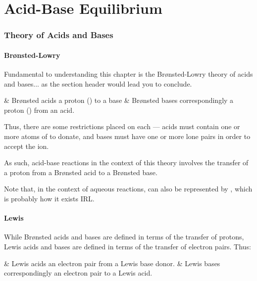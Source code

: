 

\pagebreak
\part{Acid-Base Equilibrium}

	\section{Theory of Acids and Bases}

		\subsection{Brønsted-Lowry}

			Fundamental to understanding this chapter is the Brønsted-Lowry theory of acids and bases... as the section header would lead you
			to conclude.

			\begin{bulletlist}
				& Brønsted acids  a proton () to a base
				& Brønsted bases correspondingly  a proton () from an acid.
			\end{bulletlist}

			Thus, there are some restrictions placed on each --- acids must contain one or more atoms of  to donate, and bases must have
			one or more lone pairs in order to accept the \ch{H+} ion.

			As such, acid-base reactions in the context of this theory involves the transfer of a proton from a Brønsted acid to a Brønsted base.

			Note that, in the context of aqueous reactions,  can also be represented by , which is probably how it exists IRL.


		\subsection{Lewis}

			While Brønsted acids and bases are defined in terms of the transfer of protons, Lewis acids and bases are defined in terms of the
			transfer of electron pairs. Thus:

			\begin{bulletlist}
				& Lewis acids  an electron pair from a Lewis base donor.
				& Lewis bases correspondingly  an electron pair to a Lewis acid.
			\end{bulletlist}

